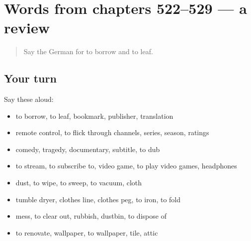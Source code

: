 \section[(dialogue)]{Words from chapters 522–529 — a review}

\label{lesson:GE-R529-review-522-529}



\begin{quote}
Say the German for to borrow and to leaf.
\end{quote}

\subsection*{Your turn}
Say these aloud:

\begin{itemize}
\raggedright
  \item to borrow, to leaf, bookmark, publisher, translation
  \item remote control, to flick through channels, series, season, ratings
  \item comedy, tragedy, documentary, subtitle, to dub
  \item to stream, to subscribe to, video game, to play video games, headphones
  \item dust, to wipe, to sweep, to vacuum, cloth
  \item tumble dryer, clothes line, clothes peg, to iron, to fold
  \item mess, to clear out, rubbish, dustbin, to dispose of
  \item to renovate, wallpaper, to wallpaper, tile, attic
\end{itemize}


